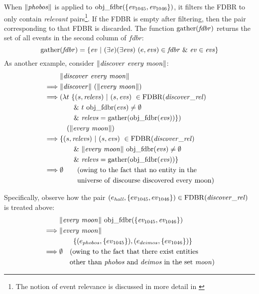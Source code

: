 \documentclass[../main.tex]{subfiles}
\begin{document}
\begin{refsection}
When $\lVert \mathit{\mathit{phobos}} \rVert$ is applied to $\mathrm{obj\_fdbr}(\mathit{\{ev_{\mathrm{1045}}, ev_{\mathrm{1046}}\}})$, it filters the FDBR
to only contain {\em relevant} pairs\footnote{The notion of event relevance is discussed in more detail in \cite{peelar2016accommodating}}.  If the FDBR is empty after filtering, then the pair corresponding to that FDBR is discarded.
The function $\mathrm{gather}({\mathit{fdbr}})$ returns the set of all events in the second column of $\mathit{fdbr}$:
\[ \gatherevs{\mathit{fdbr}} = \{ \mathit{ev}\ |\ (\exists \mathit{e})(\exists \mathit{evs})\ (e, \mathit{evs}) \in \mathit{fdbr}\ \&\ \mathit{ev} \in \mathit{evs} \} \]
As another example, consider $\lVert \mathit{\mathit{discover}\ \mathit{every}\ \mathit{moon}} \rVert$:
\begin{equation*}
	\begin{split}
		& \meaningof{\discover\ \every\ \moon} \\
		\implies & \meaningof{discover}\ (\meaningof{\every\ \moon}) \\
		\implies & (\lambda t\ \{(s, \mathit{relevs})\ |\ (s, \mathit{evs})\ \in \FDBR{\relation{\discover}}\ \\
		& \qquad \&\ t\ \objfdbr{evs} \neq \emptyset  \\
		& \qquad \&\ \mathit{relevs} = \gatherevs{\objfdbr{evs}}\})\ \\
		& \quad (\meaningof{\every\ \moon}) \\
		\implies & \{(s, \mathit{relevs})\ |\ (s, \mathit{evs})\ \in \FDBR{\relation{\discover}}\ \\
		& \qquad \&\ \meaningof{\every\ \moon}\ \objfdbr{evs} \neq \emptyset \\
		& \qquad \&\ \mathit{relevs} = \gatherevs{\objfdbr{evs}} \} \\
		\implies & \emptyset \qquad(\mathrm{owing\ to\ the\ fact\ that\ no\ entity\ in\ the} \\
		\phantom{\implies} & \phantom{\emptyset} \qquad \mathrm{universe\ of\ discourse\ discovered\ every\ moon})
	\end{split}
\end{equation*}

Specifically, observe how the pair $(e_{\mathit{hall}}, \{ ev_{\mathrm{1045}}, ev_{\mathrm{1046}} \}) \in \mathrm{FDBR}({\mathit{\mathit{discover}\_rel}})$ is treated above:
\begin{equation*}
	\begin{split}
		&\meaningof{\mathit{every\ moon}}\ \objfdbr{\{\eventassoc{1045}, \eventassoc{1046}\}} \\
		\implies & \meaningof{\mathit{every\ moon}}\ \\
		& \qquad \{(\entityassoc{phobos}, \{\eventassoc{1045}\}), (\entityassoc{deimos}, \{\eventassoc{1046}\})\} \\
		\implies & \emptyset \quad (\mathrm{owing\ to\ the\ fact\ that\ there\ exist\ entities}\ \\
		\phantom{\implies}	& \phantom{\emptyset} \quad \mathrm{other\ than\ \phobos\ and\ \deimos \ in\ the\ set\ \moon})
	\end{split}
\end{equation*}


\end{refsection}
\end{document}
